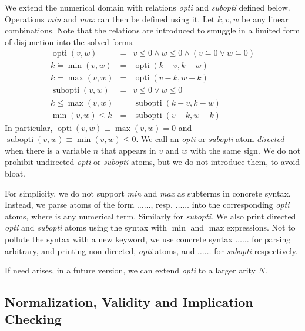 \documentclass{article}
\newcommand{\tmem}[1]{{\em #1\/}}
\newcommand{\tmop}[1]{\ensuremath{\operatorname{#1}}}
\newcommand{\tmverbatim}[1]{{\ttfamily{#1}}}
\begin{document}
We extend the numerical domain with relations {\tmem{opti}} and
{\tmem{subopti}} defined below. Operations {\tmem{min}} and {\tmem{max}} can
then be defined using it. Let $k, v, w$ be any linear combinations. Note that
the relations are introduced to smuggle in a limited form of disjunction into
the solved forms.
\begin{eqnarray*}
  \tmop{opti} (v, w) & = & v \leqslant 0 \wedge w \leqslant 0 \wedge (v
  \dot{=} 0 \vee w \dot{=} 0)\\
  k \dot{=} \min (v, w) & = & \tmop{opti} (k - v, k - w)\\
  k \dot{=} \max (v, w) & = & \tmop{opti} (v - k, w - k)\\
  \tmop{subopti} (v, w) & = & v \leqslant 0 \vee w \leqslant 0\\
  k \leqslant \max (v, w) & = & \tmop{subopti} (k - v, k - w)\\
  \min (v, w) \leqslant k & = & \tmop{subopti} (v - k, w - k)
\end{eqnarray*}
In particular, $\tmop{opti} (v, w) \equiv \max (v, w) \dot{=} 0$ and
$\tmop{subopti} (v, w) \equiv \min (v, w) \leqslant 0$. We call an
{\tmem{opti}} or {\tmem{subopti}} atom {\tmem{directed}} when there is a
variable $n$ that appears in $v$ and $w$ with the same sign. We do not
prohibit undirected {\tmem{opti}} or {\tmem{subopti}} atoms, but we do not
introduce them, to avoid bloat.

For simplicity, we do not support {\tmem{min}} and {\tmem{max}} as subterms in
concrete syntax. Instead, we parse atoms of the form
\tmverbatim{k=min(}$\ldots$\tmverbatim{,}$\ldots$\tmverbatim{)}, resp.
\tmverbatim{k=max(}$\ldots$\tmverbatim{,}$\ldots$\tmverbatim{)} into the
corresponding {\tmem{opti}} atoms, where \tmverbatim{k} is any numerical term.
Similarly for {\tmem{subopti}}. We also print directed {\tmem{opti}} and
{\tmem{subopti}} atoms using the syntax with $\min$ and $\max$expressions. Not
to pollute the syntax with a new keyword, we use concrete syntax
\tmverbatim{min\textbar max(}$\ldots$\tmverbatim{,}$\ldots$\tmverbatim{)} for
parsing arbitrary, and printing non-directed, {\tmem{opti}} atoms, and
\tmverbatim{min\textbar\textbar
max(}$\ldots$\tmverbatim{,}$\ldots$\tmverbatim{)} for {\tmem{subopti}}
respectively.

If need arises, in a future version, we can extend {\tmem{opti}} to a larger
arity $N$.

\subsection{Normalization, Validity and Implication Checking}
\end{document}
